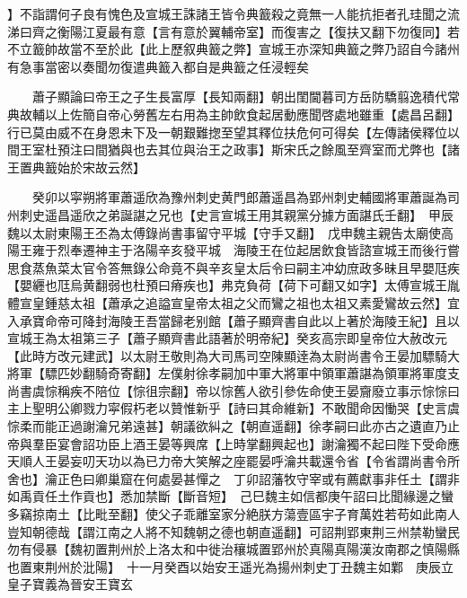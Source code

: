 】不詣謂何子良有愧色及宣城王誅諸王皆令典籖殺之竟無一人能抗拒者孔珪聞之流涕曰齊之衡陽江夏最有意【言有意於翼輔帝室】而復害之【復扶又翻下勿復同】若不立籖帥故當不至於此【此上歷叙典籖之弊】宣城王亦深知典籖之弊乃詔自今諸州有急事當密以奏聞勿復遣典籖入都自是典籖之任浸輕矣

　　蕭子顯論曰帝王之子生長富厚【長知兩翻】朝出閨閫暮司方岳防驕翦逸積代常典故輔以上佐簡自帝心勞舊左右用為主帥飲食起居動應聞啓處地雖重【處昌呂翻】行已莫由威不在身恩未下及一朝艱難揔至望其釋位扶危何可得矣【左傳諸侯釋位以間王室杜預注曰間猶與也去其位與治王之政事】斯宋氏之餘風至齊室而尤弊也【諸王置典籖始於宋故云然】

　　癸卯以寜朔將軍蕭遥欣為豫州刺史黄門郎蕭遥昌為郢州刺史輔國將軍蕭誕為司州刺史遥昌遥欣之弟誕諶之兄也【史言宣城王用其親黨分據方面諶氏壬翻】　甲辰魏以太尉東陽王丕為太傅錄尚書事留守平城【守手又翻】　戊申魏主親告太廟使高陽王雍于烈奉遷神主于洛陽辛亥發平城　海陵王在位起居飲食皆諮宣城王而後行嘗思食蒸魚菜太官令答無錄公命竟不與辛亥皇太后令曰嗣主冲幼庶政多昧且早嬰尫疾【嬰纒也尫烏黄翻弱也杜預曰瘠疾也】弗克負荷【荷下可翻又如字】太傅宣城王胤體宣皇鍾慈太祖【蕭承之追謚宣皇帝太祖之父而鸞之祖也太祖又素愛鸞故云然】宜入承寶命帝可降封海陵王吾當歸老别館【蕭子顯齊書自此以上著於海陵王紀】且以宣城王為太祖第三子【蕭子顯齊書此語著於明帝紀】癸亥高宗即皇帝位大赦改元【此時方改元建武】以太尉王敬則為大司馬司空陳顯逹為太尉尚書令王晏加驃騎大將軍【驃匹妙翻騎奇寄翻】左僕射徐孝嗣加中軍大將軍中領軍蕭諶為領軍將軍度支尚書虞悰稱疾不陪位【悰徂宗翻】帝以悰舊人欲引參佐命使王晏齎廢立事示悰悰曰主上聖明公卿戮力寜假朽老以贊惟新乎【詩曰其命維新】不敢聞命因慟哭【史言虞悰柔而能正過謝瀹兄弟遠甚】朝議欲糾之【朝直遥翻】徐孝嗣曰此亦古之遺直乃止帝與羣臣宴會詔功臣上酒王晏等興席【上時掌翻興起也】謝瀹獨不起曰陛下受命應天順人王晏妄叨天功以為已力帝大笑解之座罷晏呼瀹共載還令省【令省謂尚書令所舍也】瀹正色曰卿巢窟在何處晏甚憚之　丁卯詔藩牧守宰或有薦獻事非任土【謂非如禹貢任土作貢也】悉加禁斷【斷音短】　己巳魏主如信都庚午詔曰比聞緣邊之蠻多竊掠南土【比毗至翻】使父子乖離室家分絶朕方蕩壹區宇子育萬姓若苟如此南人豈知朝德哉【謂江南之人將不知魏朝之德也朝直遥翻】可詔荆郢東荆三州禁勒蠻民勿有侵暴【魏初置荆州於上洛太和中徙治穰城置郢州於真陽真陽漢汝南郡之慎陽縣也置東荆州於沘陽】　十一月癸酉以始安王遥光為揚州刺史丁丑魏主如鄴　庚辰立皇子寶義為晉安王寶玄

